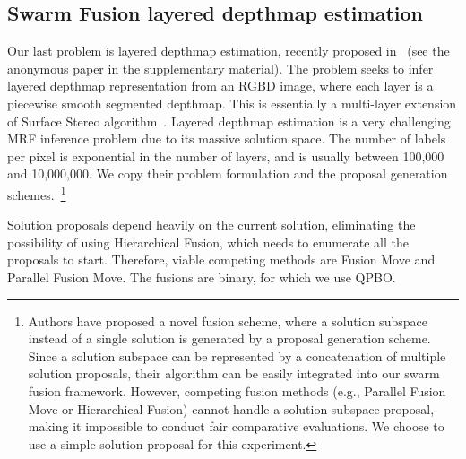 \subsection{Swarm Fusion layered depthmap estimation}

Our last problem is layered depthmap estimation, recently proposed
in~\cite{layered_depthmap} (see the anonymous paper in the
supplementary material).  The problem seeks to infer layered depthmap
representation from an RGBD image, where each layer is a piecewise
smooth segmented depthmap. This is essentially a multi-layer extension
of Surface Stereo algorithm~\cite{surface_stereo}.
%
Layered depthmap estimation is a very challenging MRF inference problem
due to its massive solution space. The number of labels per pixel is
exponential in the number of layers, and is usually between 100,000 and
10,000,000. We copy their problem formulation and the proposal
generation schemes.~\footnote{Authors have proposed a novel fusion
scheme, where a solution subspace instead of a single solution is
generated by a proposal generation scheme. Since a solution subspace can
be represented by a concatenation of multiple solution proposals,
their algorithm can be easily integrated into our swarm fusion framework.
However, competing fusion methods (e.g., Parallel Fusion Move or
Hierarchical Fusion) cannot handle a solution subspace proposal, making
it impossible to conduct fair comparative evaluations. We choose to use
a simple solution proposal for this experiment.}


\noindent Solution proposals depend heavily on the current solution,
eliminating the possibility of using Hierarchical Fusion, which needs to
enumerate all the proposals to start. Therefore, viable competing
methods are Fusion Move and Parallel Fusion Move.
%
%
The fusions are binary, for which we use QPBO.


